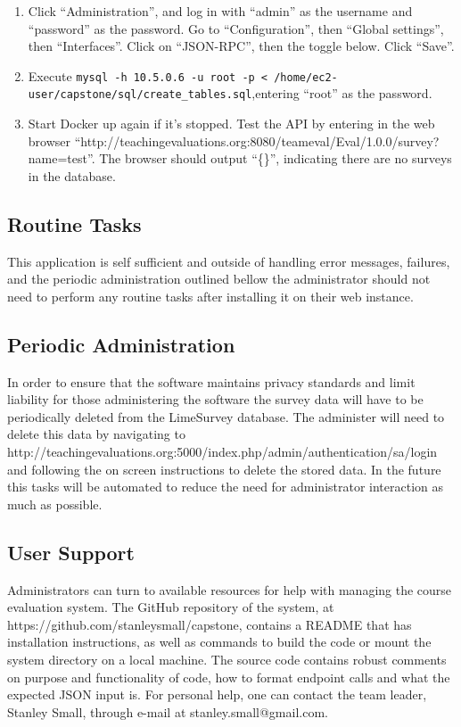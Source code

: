\documentclass{article}
\begin{document}
\begin{enumerate}
    \item Click ``Administration'', and log in with ``admin'' as the username and ``password'' as the password. Go to ``Configuration'', then ``Global settings'', then ``Interfaces''. Click on ``JSON-RPC'', then the toggle below. Click ``Save''.

    \item Execute \verb|mysql -h 10.5.0.6 -u root -p < /home/ec2-user/capstone/sql/create_tables.sql|,\newline entering ``root'' as the password.

    \item Start Docker up again if it's stopped. Test the API by entering in the web browser ``http://\newline teachingevaluations.org:8080/teameval/Eval/1.0.0/survey?name=test''. The browser should output ``\{\}'', indicating there are no surveys in the database.
\end{enumerate}

\subsection{Routine Tasks}
This application is self sufficient and outside of handling error messages, failures, and the periodic administration outlined bellow the administrator should not need to perform any routine tasks after installing it on their web instance.

\subsection{Periodic Administration}
In order to ensure that the software maintains privacy standards and limit liability for those administering the software the survey data will have to be periodically deleted from the LimeSurvey database.  The administer will need to delete this data by navigating to http://teachingevaluations.org:5000/index.php/admin/authentication/sa/login and following the on screen instructions to delete the stored data.  In the future this tasks will be automated to reduce the need for administrator interaction as much as possible.

\subsection{User Support}

Administrators can turn to available resources for help with managing the course evaluation system. The GitHub repository of the system, at https://github.com/stanleysmall/capstone, contains a README that has installation instructions, as well as commands to build the code or mount the system directory on a local machine. The source code contains robust comments on purpose and functionality of code, how to format endpoint calls and what the expected JSON input is. For personal help, one can contact the team leader, Stanley Small, through e-mail at stanley.small@gmail.com.
\end{document}
